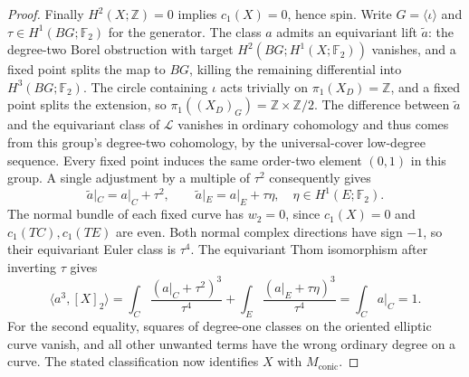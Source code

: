 \begin{proof}
Finally $H^2(X;\mathbb Z)=0$ implies $c_1(X)=0$, hence spin.
Write $G=\langle\iota\rangle$ and
$\tau\in H^1(BG;\mathbb F_2)$ for the generator.
The class $a$ admits an equivariant lift $\widetilde a$:
the degree-two Borel obstruction with target
$H^2(BG;H^1(X;\mathbb F_2))$ vanishes, and a fixed point
splits the map to $BG$, killing the remaining differential
into $H^3(BG;\mathbb F_2)$.
The circle containing $\iota$ acts trivially on
$\pi_1(X_D)=\mathbb Z$, and a fixed point splits the extension,
so $\pi_1((X_D)_G)=\mathbb Z\times\mathbb Z/2$.
The difference between $\widetilde a$ and the equivariant
class of $\mathcal L$ vanishes in ordinary cohomology and thus
comes from this group's degree-two cohomology, by the
universal-cover low-degree sequence. Every fixed point induces
the same order-two element $(0,1)$ in this group. A single
adjustment by a multiple of $\tau^2$ consequently gives
\[
 \widetilde a|_C=a|_C+\tau^2,
 \qquad \widetilde a|_E=a|_E+\tau\eta,
 \quad\eta\in H^1(E;\mathbb F_2).
\]
The normal bundle of each fixed curve has $w_2=0$, since
$c_1(X)=0$ and $c_1(TC),c_1(TE)$ are even.
Both normal complex directions have sign $-1$, so their
equivariant Euler class is $\tau^4$.
The equivariant Thom isomorphism after inverting $\tau$ gives
\[
 \langle a^3,[X]_2\rangle
 =\int_C\frac{(a|_C+\tau^2)^3}{\tau^4}
  +\int_E\frac{(a|_E+\tau\eta)^3}{\tau^4}
 =\int_C a|_C=1.
\]
For the second equality, squares of degree-one classes on the
oriented elliptic curve vanish, and all other unwanted terms
have the wrong ordinary degree on a curve. The stated
classification now identifies $X$ with $M_{\mathrm{conic}}$.
\end{proof}


